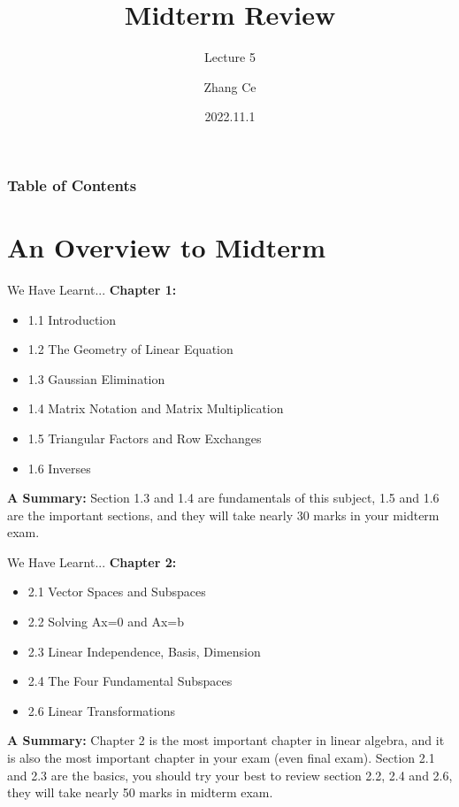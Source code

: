 \documentclass{beamer}
\title[Linear Algebra] %
{Midterm Review}
\subtitle{Lecture 5}
\author[zhangce2019@mail.sustech.edu.cn] %
{
    Zhang Ce
}
\institute[] %
{
    Department of Electrical and Electronic Engineering\\
    Southern University of Science and Technology
}
\date[2022.11.1] %
{2022.11.1}
\begin{document}
\frame{\titlepage}


\begin{frame}
\frametitle{Table of Contents}
\tableofcontents
\end{frame}
\section{An Overview to Midterm}
\begin{frame}{We Have Learnt...}
\textbf{Chapter 1:}
\begin{itemize}
    \item 1.1 Introduction
    \item 1.2 The Geometry of Linear Equation
    \item 1.3 Gaussian Elimination
    \item 1.4 Matrix Notation and Matrix Multiplication
    \item 1.5 Triangular Factors and Row Exchanges
    \item 1.6 Inverses
\end{itemize}

\vspace{5pt}
\textbf{A Summary:} Section 1.3 and 1.4 are fundamentals of this subject, 1.5 and 1.6 are the important sections, and they will take nearly 30 marks in your midterm exam.
\end{frame}

\begin{frame}{We Have Learnt...}
\textbf{Chapter 2:}
\begin{itemize}
    \item 2.1 Vector Spaces and Subspaces
    \item 2.2 Solving Ax=0 and Ax=b
    \item 2.3 Linear Independence, Basis, Dimension
    \item 2.4 The Four Fundamental Subspaces
    \item 2.6 Linear Transformations
\end{itemize}

\vspace{5pt}
\textbf{A Summary:} Chapter 2 is the most important chapter in linear algebra, and it is also the most important chapter in your exam (even final exam). Section 2.1 and 2.3 are the basics, you should try your best to review section 2.2, 2.4 and 2.6, they will take nearly 50 marks in midterm exam.
\end{frame}
\end{document}
